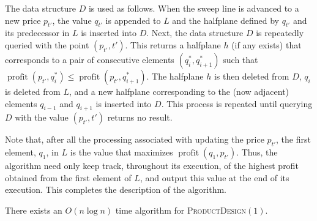\documentclass{llncs}
\newcommand{\val}{\operatorname{profit}}
\begin{document}
The data structure $D$ is used as follows.  When the sweep line is
advanced to a new price $p_{t'}$, the value $q_{t'}$ is appended to
$L$ and the halfplane defined by $q_{t'}$ and its predecessor in $L$
is inserted into $D$.  Next, the data structure $D$ is repeatedly
queried with the point $(p_{t'},t')$.  This returns a halfplane
$h$ (if any exists) that corresponds to a pair of consecutive
elements $(q_i^*,q_{i+1}^*)$ such that $\val(p_{t'},q_i^*) \le
\val(p_{t'},q_{i+1}^*)$.  The halfplane $h$ is then deleted from $D$,
$q_{i}$ is deleted from $L$, and a new halfplane corresponding to the
(now adjacent) elements $q_{i-1}$ and $q_{i+1}$ is inserted into $D$.
This process is repeated until querying $D$ with the value $(p_{t'},t')$
returns no result.

Note that, after all the processing associated with updating the price
$p_{t'}$, the first element, $q_1$, in $L$ is the value that maximizes
$\val(q_1,p_{t'})$. Thus, the algorithm need only keep track, throughout
its execution, of the highest profit obtained from the first element of
$L$, and output this value at the end of its execution.  This completes
the description of the algorithm.

\begin{thm}
  There exists an $O(n\log n)$ time algorithm for
  \textsc{ProductDesign$(1)$}.
\end{thm}

\end{document}
